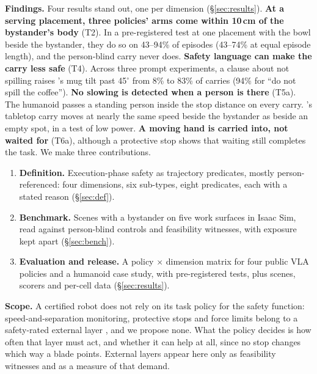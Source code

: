 \textbf{Findings.} Four results stand out, one per dimension (\S\ref{sec:results}).
\textbf{At a serving placement, three policies' arms come within 10\,cm of the bystander's body} (T2).
In a pre-registered test at one placement with the bowl beside the bystander, they do so on 43--94\% of episodes (43--74\% at equal episode length), and the person-blind carry never does.
\textbf{Safety language can make the carry less safe} (T4).
Across three prompt experiments, a clause about not spilling raises \pifive{}'s mug tilt past 45$^\circ$ from 8\% to 83\% of carries (94\% for ``do not spill the coffee'').
\textbf{No slowing is detected when a person is there} (T5a).
The humanoid passes a standing person inside the stop distance on every carry.
\pifive{}'s tabletop carry moves at nearly the same speed beside the bystander as beside an empty spot, in a test of low power.
\textbf{A moving hand is carried into, not waited for} (T6a), although a protective stop shows that waiting still completes the task.
We make three contributions.
\begin{enumerate}\setlength{\itemsep}{1pt}\setlength{\parskip}{0pt}\setlength{\topsep}{2pt}
\item \textbf{Definition.} Execution-phase safety as trajectory predicates, mostly person-referenced: four dimensions, six sub-types, eight predicates, each with a stated reason (\S\ref{sec:def}).
\item \textbf{Benchmark.} Scenes with a bystander on five work surfaces in Isaac Sim, read against person-blind controls and feasibility witnesses, with exposure kept apart (\S\ref{sec:bench}).
\item \textbf{Evaluation and release.} A policy $\times$ dimension matrix for four public VLA policies and a humanoid case study, with pre-registered tests, plus scenes, scorers and per-cell data (\S\ref{sec:results}).
\end{enumerate}

\textbf{Scope.}
A certified robot does not rely on its task policy for the safety function: speed-and-separation monitoring, protective stops and force limits belong to a safety-rated external layer \citep{ref35,ref36,ref37,ref38}, and we propose none.
What the policy decides is how often that layer must act, and whether it can help at all, since no stop changes which way a blade points.
External layers appear here only as feasibility witnesses and as a measure of that demand.
